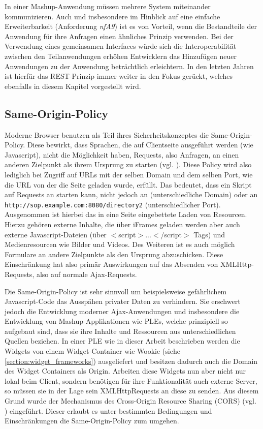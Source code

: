 In einer Mashup-Anwendung müssen mehrere System miteinander kommunizieren. Auch und insbesondere im Hinblick auf eine einfache Erweiterbarkeit (Anforderung \emph{nfA9}) ist es von Vorteil, wenn die Bestandteile der Anwendung für ihre Anfragen einen ähnliches Prinzip verwenden. Bei der Verwendung eines gemeinsamen Interfaces würde sich die Interoperabilität zwischen den Teilanwendungen erhöhen Entwicklern das Hinzufügen neuer Anwendungen zu der Anwendung beträchtlich erleichtern. In den letzten Jahren ist hierfür das REST-Prinzip immer weiter in den Fokus gerückt, welches ebenfalls in diesem Kapitel vorgestellt wird.

\subsection{Same-Origin-Policy}\label{section:same_origin_policy}
Moderne Browser benutzen als Teil ihres Sicherheitskonzeptes die Same-Origin-Policy. Diese bewirkt, dass Sprachen, die auf Clientseite ausgeführt werden (wie Javascript), nicht die Möglichkeit haben, Requests, also Anfragen, an einen anderen Zielpunkt als ihrem Ursprung zu starten (vgl. \cite{Ruderman2008}). Diese Policy wird also lediglich bei Zugriff auf URLs mit der selben Domain und dem selben Port, wie die URL von der die Seite geladen wurde, erfüllt. Das bedeutet, dass ein Skript auf  Requests an  starten kann, nicht jedoch an  (unterschiedliche Domain) oder an \texttt{http://sop.example.com:8080/directory2} (unterschiedlicher Port). Ausgenommen ist hierbei das in eine Seite eingebettete Laden von Resourcen. Hierzu gehören externe Inhalte, die über iFrames geladen werden aber auch externe Javascript-Dateien (über $<$script$>$...$<$/script$>$ Tags) und Medienresourcen wie Bilder und Videos. Des Weiteren ist es auch möglich Formulare an andere Zielpunkte als den Ursprung abzuschicken. Diese Einschränkung hat also primär Auswirkungen auf das Absenden von XMLHttp-Requests, also auf normale Ajax-Requests.

Die Same-Origin-Policy ist sehr sinnvoll um beispielsweise gefährlichem Javascript-Code das Ausspähen privater Daten zu verhindern. Sie erschwert jedoch die Entwicklung moderner Ajax-Anwendungen und insbesondere die Entwicklung von Mashup-Applikationen wie PLEs, welche prinzipiell so aufgebaut sind, dass sie ihre Inhalte und Ressourcen aus unterschiedlichen Quellen beziehen. In einer PLE wie in dieser Arbeit beschrieben werden die Widgets von einem Widget-Container wie Wookie (siehe \ref{section:widget_frameworks}) ausgeliefert und besitzen dadurch auch die Domain des Widget Containers als Origin. Arbeiten diese Widgets nun aber nicht nur lokal beim Client, sondern benötigen für ihre Funktionalität auch externe Server, so müssen sie in der Lage sein XMLHttpRequests an diese zu senden. Aus diesem Grund wurde der Mechanismus des Cross-Origin Resource Sharing (CORS) (vgl. \cite{vanKesteren2012}) eingeführt. Dieser erlaubt es unter bestimmten Bedingungen und Einschränkungen die Same-Origin-Policy zum umgehen.

